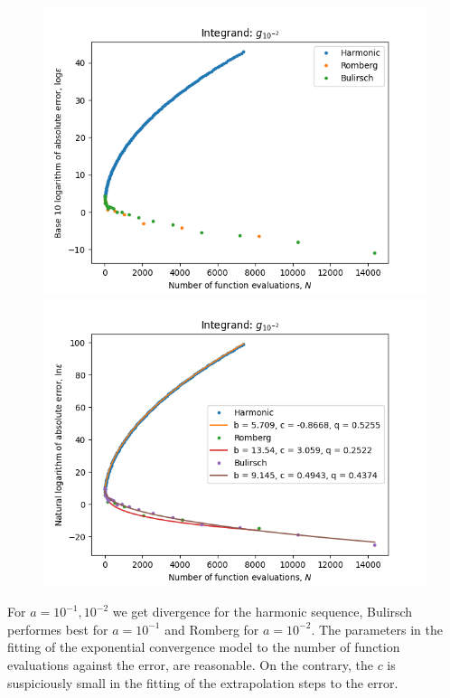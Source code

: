 \begin{figure}[H]
\centering
\begin{minipage}{0.45\textwidth}
\centering
\includegraphics[scale=0.45]{romberg_plots/g_hundredth_hp.png}
\end{minipage}
\begin{minipage}{0.45\textwidth}
\centering
\includegraphics[scale=0.45]{romberg_plots/g_hundredth_hp_trend.png}
\end{minipage}
\end{figure}

For \(a = 10^{-1}, 10^{-2}\) we get divergence for the harmonic sequence, Bulirsch performes best for \(a = 10^{-1}\) and Romberg for \(a = 10^{-2}\). The parameters in the fitting of the exponential convergence model to the number of function evaluations against the error, are reasonable. On the contrary, the \(c\) is suspiciously small in the fitting of the extrapolation steps to the error.\\

